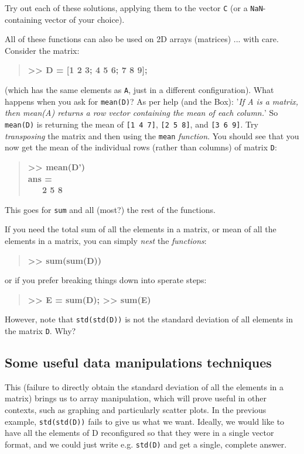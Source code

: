 \documentclass{tufte-book} %
\newenvironment{docspecbold}{\begin{quotation}\ttfamily\bfseries\parskip0pt\parindent0pt\ignorespaces}{\end{quotation}}
\begin{document}
Try out each of these solutions, applying them to the vector \texttt{C} (or a \texttt{NaN}-containing vector of your choice).

All of these functions can also be used on 2D arrays (matrices) ... with care. Consider the matrix:
\begin{docspecbold}
>> D = [1 2 3; 4 5 6; 7 8 9];
\end{docspecbold}
(which has the same elements as \texttt{A}, just in a different configuration). What happens when you ask for \texttt{mean(D)}? As per help (and the Box): '\textit{If A is a matrix, then mean(A) returns a row vector containing the mean of each column.}' So \texttt{mean(D)} is returning the mean of \texttt{[1 4 7]}, \texttt{[2 5 8]}, and \texttt{[3 6 9]}. Try \textit{transposing} the matrix and then using the \texttt{mean} \textit{function}. You should see that you now get the mean of the individual rows (rather than columns) of matrix \texttt{D}:
\begin{docspecbold}
>> mean(D')\\
ans =\\
\ \ \ 2     5     8
\end{docspecbold}

This goes for \texttt{sum} and all (most?) the rest of the functions.

If you need the total sum of all the elements in a matrix, or mean of all the elements in a matrix, you can simply \textit{nest} the \textit{functions}:
\begin{docspecbold}
>> sum(sum(D))
\end{docspecbold}
or if you prefer breaking things down into sperate steps:
\begin{docspecbold}
>> E = sum(D);
>> sum(E)
\end{docspecbold}

However, note that \texttt{std(std(D))} is not the standard deviation of all elements in the matrix \texttt{D}. Why?


\subsection{Some useful data manipulations techniques}

This (failure to directly obtain the standard deviation of all the elements in a matrix) brings us to array manipulation, which will prove useful in other contexts, such as graphing and particularly scatter plots. In the previous example, \texttt{std(std(D))} fails to give us what we want. Ideally, we would like to have all the elements of D reconfigured so that they were in a single vector format, and we could just write e.g. \texttt{std(D)} and get a single, complete answer.
\end{document}
